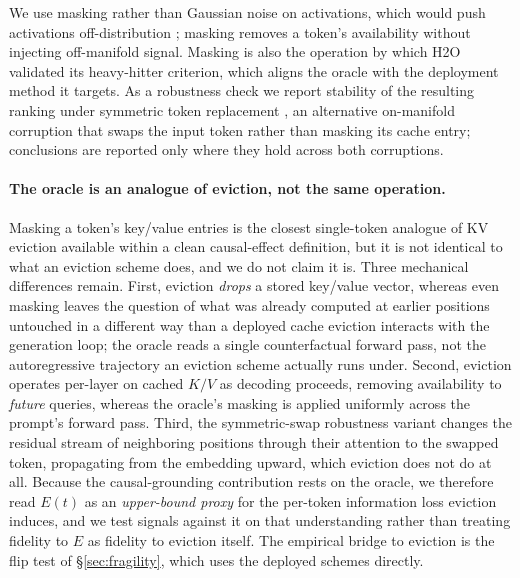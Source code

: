 \documentclass[11pt]{article}
\begin{document}
We use masking rather than Gaussian noise on activations, which would push
activations off-distribution \citep{zhang2024}; masking removes a token's
availability without injecting off-manifold signal. Masking is also the
operation by which H2O validated its heavy-hitter criterion, which aligns the
oracle with the deployment method it targets. As a robustness check we report
stability of the resulting ranking under symmetric token replacement
\citep{zhang2024}, an alternative on-manifold corruption that swaps the input
token rather than masking its cache entry; conclusions are reported only where
they hold across both corruptions.

\paragraph{The oracle is an analogue of eviction, not the same operation.}
Masking a token's key/value entries is the closest single-token analogue of
KV eviction available within a clean causal-effect definition, but it is not
identical to what an eviction scheme does, and we do not claim it is. Three
mechanical differences remain. First, eviction \emph{drops} a stored
key/value vector, whereas even masking leaves the question of what was already
computed at earlier positions untouched in a different way than a deployed
cache eviction interacts with the generation loop; the oracle reads a single
counterfactual forward pass, not the autoregressive trajectory an eviction
scheme actually runs under. Second, eviction operates per-layer on cached
$K/V$ as decoding proceeds, removing availability to \emph{future} queries,
whereas the oracle's masking is applied uniformly across the prompt's forward
pass. Third, the symmetric-swap robustness variant changes the residual
stream of neighboring positions through their attention to the swapped token,
propagating from the embedding upward, which eviction does not do at all.
Because the causal-grounding contribution rests on the oracle, we therefore
read $E(t)$ as an \emph{upper-bound proxy} for the per-token information loss
eviction induces, and we test signals against it on that understanding rather
than treating fidelity to $E$ as fidelity to eviction itself. The empirical
bridge to eviction is the flip test of \S\ref{sec:fragility}, which uses the
deployed schemes directly.
\end{document}
